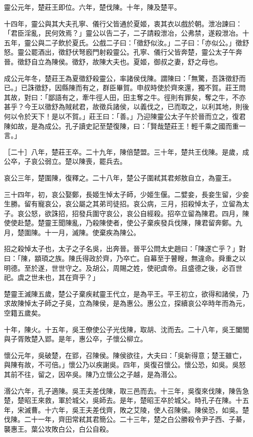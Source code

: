 \begin{pinyinscope}
靈公元年，楚莊王即位。六年，楚伐陳。十年，陳及楚平。

十四年，靈公與其大夫孔寧、儀行父皆通於夏姬，衷其衣以戲於朝。泄冶諫曰：「君臣淫亂，民何效焉？」靈公以告二子，二子請殺泄冶，公弗禁，遂殺泄冶。十五年，靈公與二子飲於夏氏。公戲二子曰：「徵舒似汝。」二子曰：「亦似公。」徵舒怒。靈公罷酒出，徵舒伏弩廏門射殺靈公。孔寧、儀行父皆奔楚，靈公太子午奔晉。徵舒自立為陳侯。徵舒，故陳大夫也。夏姬，御叔之妻，舒之母也。

成公元年冬，楚莊王為夏徵舒殺靈公，率諸侯伐陳。謂陳曰：「無驚，吾誅徵舒而已。」已誅徵舒，因縣陳而有之，群臣畢賀。申叔時使於齊來還，獨不賀。莊王問其故，對曰：「鄙語有之，牽牛徑人田，田主奪之牛。徑則有罪矣，奪之牛，不亦甚乎？今王以徵舒為賊弒君，故徵兵諸侯，以義伐之，已而取之，以利其地，則後何以令於天下！是以不賀。」莊王曰：「善。」乃迎陳靈公太子午於晉而立之，復君陳如故，是為成公。孔子讀史記至楚復陳，曰：「賢哉楚莊王！輕千乘之國而重一言。」

［二十］八年，楚莊王卒。二十九年，陳倍楚盟。三十年，楚共王伐陳。是歲，成公卒，子哀公弱立。楚以陳喪，罷兵去。

哀公三年，楚圍陳，復釋之。二十八年，楚公子圍弒其君郟敖自立，為靈王。

三十四年，初，哀公娶鄭，長姬生悼太子師，少姬生偃。二嬖妾，長妾生留，少妾生勝。留有寵哀公，哀公屬之其弟司徒招。哀公病，三月，招殺悼太子，立留為太子。哀公怒，欲誅招，招發兵圍守哀公，哀公自經殺。招卒立留為陳君。四月，陳使使赴楚。楚靈王聞陳亂，乃殺陳使者，使公子棄疾發兵伐陳，陳君留奔鄭。九月，楚圍陳。十一月，滅陳。使棄疾為陳公。

招之殺悼太子也，太子之子名吳，出奔晉。晉平公問太史趙曰：「陳遂亡乎？」對曰：「陳，顓頊之族。陳氏得政於齊，乃卒亡。自幕至于瞽瞍，無違命。舜重之以明德。至於遂，世世守之。及胡公，周賜之姓，使祀虞帝。且盛德之後，必百世祀。虞之世未也，其在齊乎？」

楚靈王滅陳五歲，楚公子棄疾弒靈王代立，是為平王。平王初立，欲得和諸侯，乃求故陳悼太子師之子吳，立為陳侯，是為惠公。惠公立，探續哀公卒時年而為元，空籍五歲矣。

十年，陳火。十五年，吳王僚使公子光伐陳，取胡、沈而去。二十八年，吳王闔閭與子胥敗楚入郢。是年，惠公卒，子懷公柳立。

懷公元年，吳破楚，在郢，召陳侯。陳侯欲往，大夫曰：「吳新得意；楚王雖亡，與陳有故，不可倍。」懷公乃以疾謝吳。四年，吳復召懷公。懷公恐，如吳。吳怒其前不往，留之，因卒吳。陳乃立懷公之子越，是為湣公。

湣公六年，孔子適陳。吳王夫差伐陳，取三邑而去。十三年，吳復來伐陳，陳告急楚，楚昭王來救，軍於城父，吳師去。是年，楚昭王卒於城父。時孔子在陳。十五年，宋滅曹。十六年，吳王夫差伐齊，敗之艾陵，使人召陳侯。陳侯恐，如吳。楚伐陳。二十一年，齊田常弒其君簡公。二十三年，楚之白公勝殺令尹子西、子綦，襲惠王。葉公攻敗白公，白公自殺。


\end{pinyinscope}
